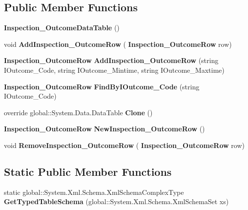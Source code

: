 \subsection*{Public Member Functions}
\begin{DoxyCompactItemize}
\item 
\textbf{ Inspection\+\_\+\+Outcome\+Data\+Table} ()
\item 
void \textbf{ Add\+Inspection\+\_\+\+Outcome\+Row} (\textbf{ Inspection\+\_\+\+Outcome\+Row} row)
\item 
\textbf{ Inspection\+\_\+\+Outcome\+Row} \textbf{ Add\+Inspection\+\_\+\+Outcome\+Row} (string I\+Outcome\+\_\+\+Code, string I\+Outcome\+\_\+\+Mintime, string I\+Outcome\+\_\+\+Maxtime)
\item 
\textbf{ Inspection\+\_\+\+Outcome\+Row} \textbf{ Find\+By\+I\+Outcome\+\_\+\+Code} (string I\+Outcome\+\_\+\+Code)
\item 
override global\+::\+System.\+Data.\+Data\+Table \textbf{ Clone} ()
\item 
\textbf{ Inspection\+\_\+\+Outcome\+Row} \textbf{ New\+Inspection\+\_\+\+Outcome\+Row} ()
\item 
void \textbf{ Remove\+Inspection\+\_\+\+Outcome\+Row} (\textbf{ Inspection\+\_\+\+Outcome\+Row} row)
\end{DoxyCompactItemize}
\subsection*{Static Public Member Functions}
\begin{DoxyCompactItemize}
\item 
static global\+::\+System.\+Xml.\+Schema.\+Xml\+Schema\+Complex\+Type \textbf{ Get\+Typed\+Table\+Schema} (global\+::\+System.\+Xml.\+Schema.\+Xml\+Schema\+Set xs)
\end{DoxyCompactItemize}
